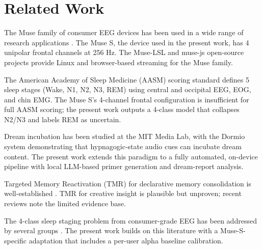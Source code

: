 \section{Related Work}
\label{sec:related}


The Muse family of consumer EEG devices has been used in a wide range of
research applications \citep{brainflow2022}. The Muse S, the device used
in the present work, has 4 unipolar frontal channels at 256 Hz. The
Muse-LSL and muse-js open-source projects provide Linux and browser-based
streaming for the Muse family.

The American Academy of Sleep Medicine (AASM) scoring standard
\citep{berry2017} defines 5 sleep stages (Wake, N1, N2, N3, REM) using
central and occipital EEG, EOG, and chin EMG. The Muse S's 4-channel
frontal configuration is insufficient for full AASM scoring; the
present work outputs a 4-class model that collapses N2/N3 and labels REM
as uncertain.

Dream incubation has been studied at the MIT Media Lab, with the Dormio
system \citep{maes2020dormio} demonstrating that hypnagogic-state audio
cues can incubate dream content. The present work extends this paradigm
to a fully automated, on-device pipeline with local LLM-based primer
generation and dream-report analysis.

Targeted Memory Reactivation (TMR) for declarative memory consolidation
is well-established \citep{rasch2013}. TMR for creative insight is
plausible but unproven; recent reviews \citep{schreiner2024sleep} note
the limited evidence base.

The 4-class sleep staging problem from consumer-grade EEG has been
addressed by several groups \citep{kothe2019}. The present work builds on
this literature with a Muse-S-specific adaptation that includes a
per-user alpha baseline calibration.
